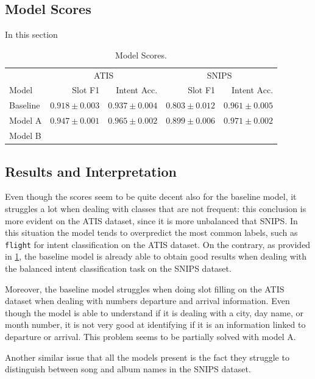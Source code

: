 \documentclass[a4paper]{article}
\begin{document}
\subsection{Model Scores}
In this section

\begin{table}[hbtp]
    \centering
    \begin{tabular}{lrrrr}
        \toprule
            & \multicolumn{2}{c}{ATIS} & \multicolumn{2}{c}{SNIPS} \\
            Model & Slot F1  & Intent Acc. & Slot F1 & Intent Acc.\\
        \midrule
            Baseline & $0.918 \pm 0.003$ & $0.937 \pm 0.004$ & $0.803 \pm 0.012$ & $0.961 \pm 0.005$ \vspace{0.2cm}\\
            Model A & $0.947 \pm 0.001$ & $0.965 \pm 0.002$ & $0.899 \pm 0.006$ & $0.971 \pm 0.002$ \vspace{0.2cm}\\
            Model B & & & & \\
        \bottomrule
    \end{tabular}
    \caption{Model Scores.}
    \label{tab:model-score}
\end{table}

\subsection{Results and Interpretation}
Even though the scores seem to be quite decent also for the baseline model, it struggles a lot when dealing with classes that are not frequent: this conclusion is more evident on the ATIS dataset, since it is more unbalanced that SNIPS. In this situation the model tends to overpredict the most common labels, such as \texttt{flight} for intent classification on the ATIS dataset. On the contrary, as provided in \cref{tab:model-score}, the baseline model is already able to obtain good results when dealing with the balanced intent classification task on the SNIPS dataset. 

Moreover, the baseline model struggles when doing slot filling on the ATIS dataset when dealing with numbers departure and arrival information. Even though the model is able to understand if it is dealing with a city, day name, or month number, it is not very good at identifying if it is an information linked to departure or arrival. This problem seems to be partially solved with model A.

Another similar issue that all the models present is the fact they struggle to distinguish between song and album names in the SNIPS dataset.
\end{document}
